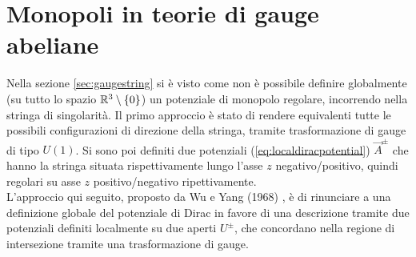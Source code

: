 \chapter{Monopoli in teorie di gauge abeliane}
Nella sezione \ref{sec:gaugestring} si è visto come non è possibile definire globalmente
(su tutto lo spazio $\mathbb{R}^3 \setminus \{0\}$) un potenziale di monopolo regolare,
incorrendo nella stringa di singolarità. Il primo approccio è stato di rendere
equivalenti tutte le possibili configurazioni di direzione della stringa, tramite
trasformazione di gauge di tipo $U(1)$. Si sono poi definiti due potenziali
(\ref{eq:localdiracpotential}) $\vec A ^\pm$ che hanno la stringa situata rispettivamente
lungo l'asse $z$ negativo/positivo, quindi regolari su asse $z$ positivo/negativo
ripettivamente.\\
L'approccio qui seguito, proposto da Wu e Yang (1968) \cite{wuyang}, è di
rinunciare a una definizione globale del potenziale di Dirac
in favore di una descrizione tramite due potenziali definiti localmente su due aperti
$U^\pm$, che concordano nella regione di intersezione tramite una trasformazione
di gauge.\\

